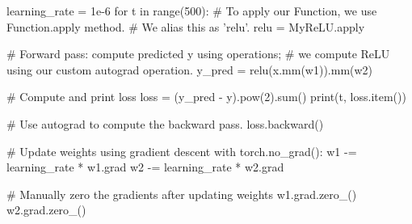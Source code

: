 \documentclass[11pt]{article}
\begin{document}
\begin{python}
learning_rate = 1e-6
for t in range(500):
    # To apply our Function, we use Function.apply method.
    # We alias this as 'relu'.
    relu = MyReLU.apply

    # Forward pass: compute predicted y using operations;
    # we compute ReLU using our custom autograd operation.
    y_pred = relu(x.mm(w1)).mm(w2)

    # Compute and print loss
    loss = (y_pred - y).pow(2).sum()
    print(t, loss.item())

    # Use autograd to compute the backward pass.
    loss.backward()

    # Update weights using gradient descent
    with torch.no_grad():
        w1 -= learning_rate * w1.grad
        w2 -= learning_rate * w2.grad

        # Manually zero the gradients after updating weights
        w1.grad.zero_()
        w2.grad.zero_()
\end{python}{}
\clearpage
\end{document}
